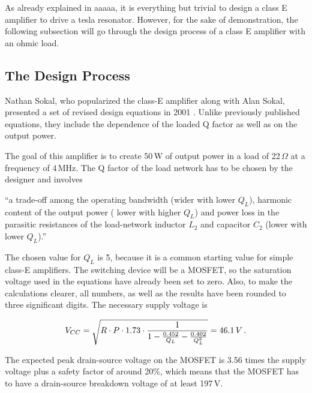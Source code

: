 As already explained in aaaaa, it is everything but trivial to design a class E amplifier to drive a tesla resonator. However, for the sake of demonstration, the following subsection will go through the design process of a class E amplifier with an ohmic load.

\subsection{The Design Process}

Nathan Sokal, who popularized the class-E amplifier along with Alan Sokal, presented a set of revised design equations in 2001 . Unlike previously published equations, they include the dependence of the loaded Q factor as well as on the output power.

The goal of this amplifier is to create 50\,W of output power in a load of 22\,\(\Omega\) at a frequency of 4\,MHz. The Q factor of the load network has to be chosen by the designer and involves 

\begin{displayquote}
\enquote{a trade-off among the operating bandwidth (wider with lower \(Q_L\)), harmonic content of the output power (\textelp{} lower with higher \(Q_L\)) and power loss in the parasitic resistances of the load-network inductor \(L_2\) and capacitor \(C_2\) (lower with lower \(Q_L\)).}
\end{displayquote}

The chosen value for \(Q_L\) is 5, because it is a common starting value for simple class-E amplifiers. The switching device will be a MOSFET, so the saturation voltage used in the equations have already been set to zero. Also, to make the calculations clearer, all numbers, as well as the results have been rounded to three significant digits. The necessary supply voltage is

\begin{equation*}
    V_{CC} = \sqrt{R \cdot P \cdot 1.73 \cdot \frac{1}{1 - \frac{0.452}{Q_L} - \frac{0.402}{Q_L^2}}} = 46.1\,V\textnormal{\,.}
\end{equation*}

The expected peak drain-source voltage on the MOSFET is 3.56 times the supply voltage plus a safety factor of around 20\%, which means that the MOSFET has to have a drain-source breakdown voltage of at least 197\,V. 

